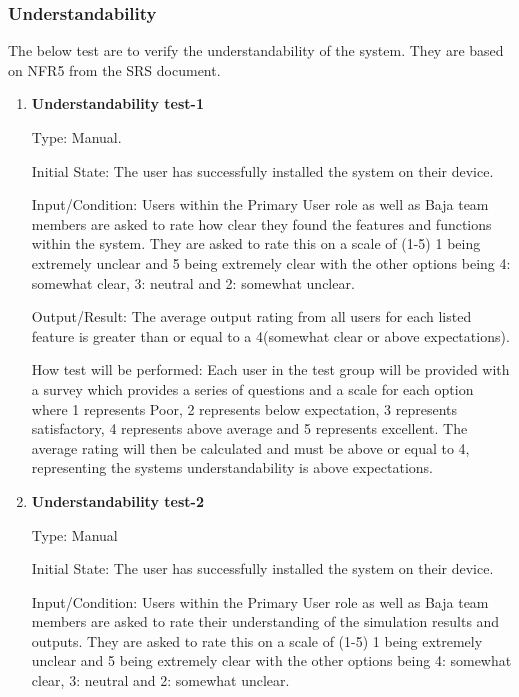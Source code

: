 \documentclass[12pt, titlepage]{article}
\begin{document}
\subsubsection{Understandability}

The below test are to verify the understandability of the system.
They are based on NFR5 from the SRS document.

\begin{enumerate}

  \item {} \hypertarget{Understandability test-1}{\textbf{Understandability test-1}} \label{Understandability test-1}

Type: Manual.
					
Initial State: The user has successfully installed the system on their device.
					
Input/Condition: Users within the Primary User role as well as Baja team members are asked to rate how clear they found the features and functions within the system. 
They are asked to rate this on a scale of (1-5) 1 being extremely unclear and 5 being extremely clear with the other options being 4: somewhat clear, 3: neutral and 2: somewhat unclear. 
					
Output/Result: The average output rating from all users for each listed feature is greater than or equal to a 4(somewhat clear or above expectations).
					
How test will be performed: Each user in the test group will be provided with a survey which provides a series of questions and a scale for each option where 1 represents Poor, 2 represents below expectation, 3 represents satisfactory, 4 represents above average and 5 represents excellent.
The average rating will then be calculated and must be above or equal to 4, representing the systems understandability is above expectations.  

 \item {} \hypertarget{Understandability test-2}{\textbf{Understandability test-2}} \label{Understandability test-2}

Type: Manual
					
Initial State: The user has successfully installed the system on their device.
					
Input/Condition: Users within the Primary User role as well as Baja team members are asked to rate their understanding of the simulation results and outputs. 
They are asked to rate this on a scale of (1-5) 1 being extremely unclear and 5 being extremely clear with the other options being 4: somewhat clear, 3: neutral and 2: somewhat unclear. 
					

\end{enumerate}
\end{document}
